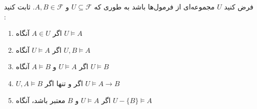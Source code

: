 \documentclass[]{exam}
\begin{document}
فرض کنید $U$ مجموعه‌‌ای از فرمول‌ها باشد به طوری که $U \subseteq \mathscr{F}$ و $A, B \in \mathscr{F}$.
ثابت کنید :
\begin{enumerate}
    \item اگر
    $A \in U$
    آنگاه
    $U \models A$

    \item اگر
    $U \models A$
    آنگاه
    $U,B \models A$

    \item اگر
    $U \models A$ و $A \models B$
    آنگاه
    $U \models B$

    \item
    $U,A \models B$
    اگر و تنها اگر
    $U \models A \to B$

    \item اگر
    $U \models A$ و $B$
    معتبر باشد، آنگاه
    $U - \lbrace B \rbrace \models A$
\end{enumerate}
\end{document}
